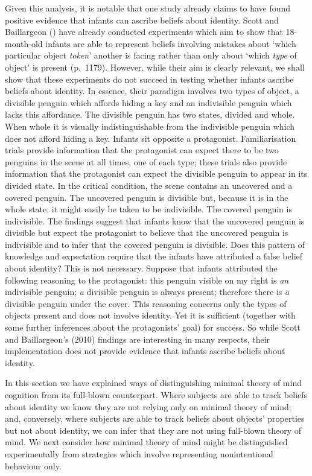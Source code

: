 \documentclass[12pt,\papersize]{extarticle}
\begin{document}
Given this analysis, it is notable that one study already claims to have found positive evidence that infants can ascribe beliefs about identity. 
Scott and Baillargeon (\citeyear{en_1690}) have already conducted experiments which aim to show that 18-month-old infants are able to represent beliefs involving mistakes about `which particular object \textit{token}' another is facing rather than only about `which \textit{type} of object' is present (p.\ 1179). However, while their aim is clearly relevant, we shall show that these experiments do not succeed in testing whether infants ascribe beliefs about identity.  In essence, their paradigm involves two types of object, a divisible penguin which affords hiding a key and an indivisible penguin which lacks this affordance.  The divisible penguin has two states, divided and whole.  When whole it is visually indistinguishable from the indivisible penguin which does not afford hiding a key.  Infants sit opposite a protagonist.  Familiarisation trials provide information that the protagonist can expect there to be two penguins in the scene at all times, one of each type; these trials also provide information that the protagonist can expect the divisible penguin to appear in its divided state. In the critical condition, the scene contains an uncovered and a covered penguin. The uncovered penguin is divisible but, because it is in the whole state, it might easily be taken to be indivisible.  The covered penguin is indivisible.  The findings suggest that infants know that the uncovered penguin is divisible but expect the protagonist to believe that the uncovered penguin is indivisible and to infer that the covered penguin is divisible.  Does this pattern of knowledge and expectation require that the infants have attributed a false belief about identity?  This is not necessary. Suppose that infants attributed the following reasoning to the protagonist: this penguin visible on my right is \textit{an} indivisible penguin; \textit{a} divisible penguin is always present; therefore there is \textit{a} divisible penguin under the cover.  This reasoning concerns only the types of objects present and does not involve identity. Yet it is sufficient (together with some further inferences about the protagonists’ goal) for success. So while Scott and Baillargeon’s (2010) findings are interesting in many respects, their implementation does not provide evidence that infants ascribe beliefs about identity.

In this section we have explained ways of distinguishing minimal theory of mind cognition from its full-blown counterpart.  Where subjects are able to track beliefs about identity we know they are not relying only on minimal theory of mind; and, conversely, where subjects are able to track beliefs about objects’ properties but not about identity, we can infer that they are not using full-blown theory of mind.  We next consider how  minimal theory of mind might be distinguished experimentally from strategies which involve representing nonintentional behaviour only.
	
\end{document}
